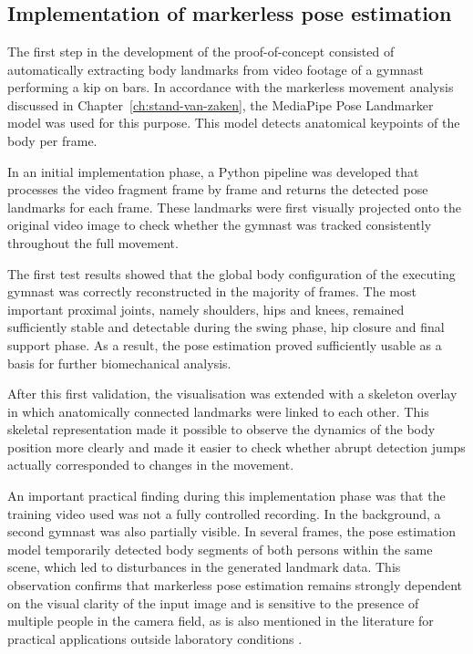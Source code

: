
\chapter{}
\label{ch:resultaten}

\section{Implementation of markerless pose estimation}

The first step in the development of the proof-of-concept consisted of automatically extracting body landmarks from video footage of a gymnast performing a kip on bars. In accordance with the markerless movement analysis discussed in Chapter~\ref{ch:stand-van-zaken}, the MediaPipe Pose Landmarker model was used for this purpose. This model detects anatomical keypoints of the body per frame.

In an initial implementation phase, a Python pipeline was developed that processes the video fragment frame by frame and returns the detected pose landmarks for each frame. These landmarks were first visually projected onto the original video image to check whether the gymnast was tracked consistently throughout the full movement.

The first test results showed that the global body configuration of the executing gymnast was correctly reconstructed in the majority of frames. The most important proximal joints, namely shoulders, hips and knees, remained sufficiently stable and detectable during the swing phase, hip closure and final support phase. As a result, the pose estimation proved sufficiently usable as a basis for further biomechanical analysis.

After this first validation, the visualisation was extended with a skeleton overlay in which anatomically connected landmarks were linked to each other. This skeletal representation made it possible to observe the dynamics of the body position more clearly and made it easier to check whether abrupt detection jumps actually corresponded to changes in the movement.

An important practical finding during this implementation phase was that the training video used was not a fully controlled recording. In the background, a second gymnast was also partially visible. In several frames, the pose estimation model temporarily detected body segments of both persons within the same scene, which led to disturbances in the generated landmark data. This observation confirms that markerless pose estimation remains strongly dependent on the visual clarity of the input image and is sensitive to the presence of multiple people in the camera field, as is also mentioned in the literature for practical applications outside laboratory conditions \autocite{Ota2025Markerless}.

